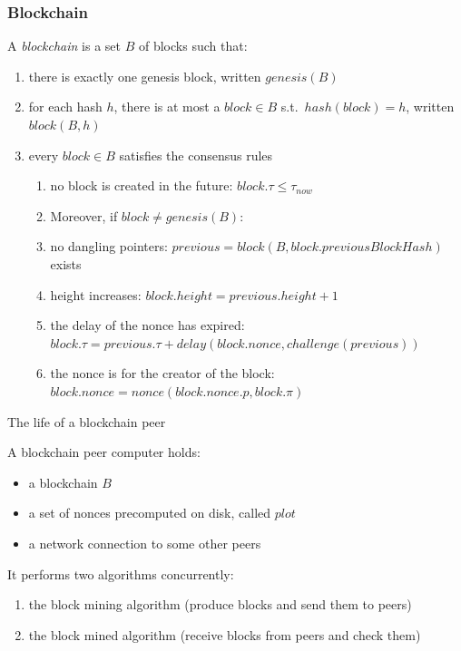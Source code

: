 \documentclass[11pt]{beamer}  %
\newcommand{\nonce}{{\mathit{nonce}}}
\newcommand{\plot}{{\mathit{plot}}}
\newcommand{\previous}{{\mathit{previous}}}
\newcommand{\challenge}{{\mathit{challenge}}}
\newcommand{\delay}{{\mathit{delay}}}
\newcommand{\height}{{\mathit{height}}}
\renewcommand{\block}{{\mathit{block}}}
\newcommand{\now}{{\mathit{now}}}
\newcommand{\hash}{{\mathit{hash}}}
\newcommand{\previousblockhash}{{\mathit{previousBlockHash}}}
\newcommand{\genesis}{{\mathit{genesis}}}
\begin{document}
\begin{frame}\frametitle{Blockchain}

  A \emph{blockchain} is a set $B$ of blocks such that:
  \begin{enumerate}
    \pause
  \item there is exactly one genesis block, written $\genesis(B)$
    \pause
  \item for each hash $h$, there is at most a $\block\in B$ s.t.\ $\hash(\block)=h$,
    written $\block(B,h)$
    \pause
  \item every $\block\in B$ satisfies the {\color{red}consensus rules}
    \begin{enumerate}
      \pause
    \item[a] {\color{red}no block is created in the future:} $\block.\tau\le\tau_\now$
      \pause
    \item[] Moreover, if $\block\not=\genesis(B)$:
      \pause
    \item[b] {\color{red}no dangling pointers:}
      $\previous=\block(B,\block.\previousblockhash)$ exists
      \pause
    \item[c] {\color{red}height increases:} $\block.\height=\previous.\height+1$
      \pause
    \item[d] {\color{red}the delay of the nonce has expired:} $\block.\tau=\previous.\tau+\delay(\block.\nonce,\challenge(\previous))$
      \pause
    \item[e] {\color{red}the nonce is for the creator of the block:}
      $\block.\nonce=\nonce(\block.\nonce.p,\block.\pi)$
    \end{enumerate}
  \end{enumerate}
\end{frame}

\addtocounter{framenumber}{-1}

\begin{frame}{The life of a blockchain peer}

  A blockchain peer computer holds:
  \begin{itemize}
  \item a blockchain $B$
  \item a set of nonces precomputed on disk, called $\plot$
  \item a network connection to some other peers
  \end{itemize}

  \bigskip
  \pause
  It performs two algorithms concurrently:
  \begin{enumerate}
    \pause
  \item the block mining algorithm (produce blocks and send them to peers)
    \pause
  \item the block mined algorithm (receive blocks from peers and check them)
  \end{enumerate}

\end{frame}
\end{document}
